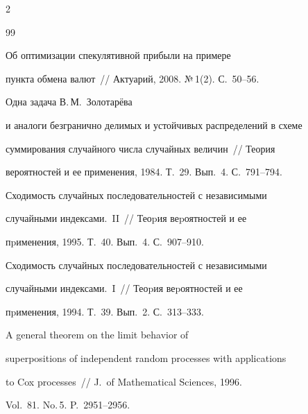\begin{multicols}{2}
{{\begin{thebibliography}{99}


Об оптимизации спекулятивной прибыли на примере


пункта обмена валют~// Актуарий, 2008. №\,1(2). С.~50--56.









Одна задача В.\,М.~Золотарёва


и аналоги безгранично делимых и устойчивых распределений в схеме


суммирования случайного числа случайных величин~// Теория


вероятностей и ее применения, 1984. Т.~29. Вып.~4. С.~791--794.









Сходимость случайных последовательностей с независимыми


случайными индексами.~II~// Теоpия веpоятностей и ее


пpименения, 1995. Т.~40. Вып.~4. С.~907--910.









Сходимость случайных последовательностей с независимыми


случайными индексами.~I~// Теоpия веpоятностей и ее


пpименения, 1994. Т.~39. Вып.~2. С.~313--333.









A general theorem on the limit behavior of


superpositions of independent random processes with applications


to Cox processes~// J.\ of Mathematical Sciences, 1996.


Vol.~81. No.\,5. P.~2951--2956.






\end{thebibliography}}}
\end{multicols}
